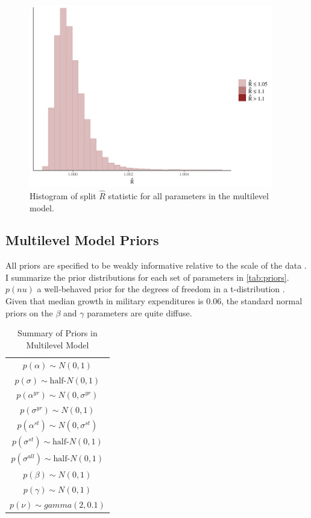 \documentclass[12pt]{article}
\begin{document}
\begin{figure}[htbp]
	\centering
		\includegraphics[width=0.95\textwidth]{rhat-plot.pdf}
	\caption{Histogram of split $\hat{R}$ statistic for all parameters in the multilevel model.}
	\label{fig:rhat-plot}
\end{figure}
 


\subsection{Multilevel Model Priors} 

All priors are specified to be weakly informative relative to the scale of the data \citep{Gelmanetal2017}. 
I summarize the prior distributions for each set of parameters in \autoref{tab:priors}. 
$p(nu)$ a well-behaved prior for the degrees of freedom in a t-distribution \citep{JuarezSteele2010}. 
Given that median growth in military expenditures is 0.06, the standard normal priors on the $\beta$ and $\gamma$ parameters are quite diffuse. 


\begin{table} %
\begin{center}
\begin{tabular}{c} 
$ p(\alpha) \sim N(0, 1)$  \\
$ p(\sigma) \sim \mbox{half-}N(0, 1) $ \\
$ p(\alpha^{yr}) \sim N(0, \sigma^{yr}) $ \\ 
$ p(\sigma^{yr}) \sim N(0, 1) $ \\
$ p(\alpha^{st}) \sim N(0, \sigma^{st}) $ \\ 
$ p(\sigma^{st}) \sim \mbox{half-}N(0, 1) $ \\ 
$ p(\sigma^{all}) \sim \mbox{half-}N(0, 1) $ \\
$ p(\beta) \sim N(0, 1) $ \\
$ p(\gamma) \sim N(0, 1) $ \\ 
$ p(\nu) \sim gamma(2, 0.1)$ 
\end{tabular} 
\caption{Summary of Priors in Multilevel Model} 
\label{tab:priors}
\end{center} 
\end{table} 
\end{document}
